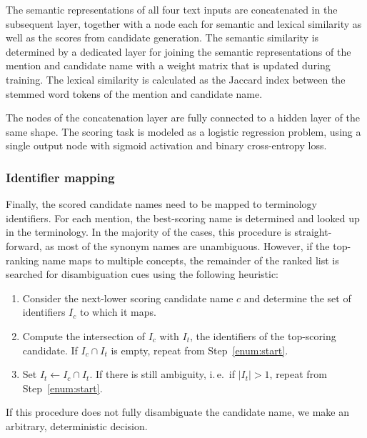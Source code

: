 \documentclass{bioinfo}
\newcommand{\ie}{i.\,e.\ }
\begin{document}
The semantic representations of all four text inputs are concatenated in the subsequent layer, together with a node each for semantic and lexical similarity as well as the scores from candidate generation.
The semantic similarity is determined by a dedicated layer for joining the semantic representations of the mention and candidate name with a weight matrix that is updated during training.
The lexical similarity is calculated as the Jaccard index  %
between the stemmed word tokens \citep{porter:1980} of the mention and candidate name.

The nodes of the concatenation layer are fully connected to a hidden layer of the same shape.
The scoring task is modeled as a logistic regression problem, using a single output node with sigmoid activation and binary cross-entropy loss.

\subsubsection{Identifier mapping}
\label{ssub:id-mapping}

Finally, the scored candidate names need to be mapped to terminology identifiers.
For each mention, the best-scoring name is determined and looked up in the terminology.
In the majority of the cases, this procedure is straight-forward, as most of the synonym names are unambiguous.  %
However, if the top-ranking name maps to multiple concepts, the remainder of the ranked list is searched for disambiguation cues using the following heuristic:
\begin{enumerate}
  \item\label{enum:start} Consider the next-lower scoring candidate name $c$ and determine the set of identifiers $I_c$ to which it maps.
  \item Compute the intersection of $I_c$ with $I_t$, the identifiers of the top-scoring candidate. If $I_c \cap I_t$ is empty, repeat from Step~\ref{enum:start}.
  \item Set $I_t \leftarrow I_c \cap I_t$. If there is still ambiguity, \ie if $|I_t| > 1$, repeat from Step~\ref{enum:start}.
\end{enumerate}
If this procedure does not fully disambiguate the candidate name, we make an arbitrary, deterministic decision.
\end{document}
